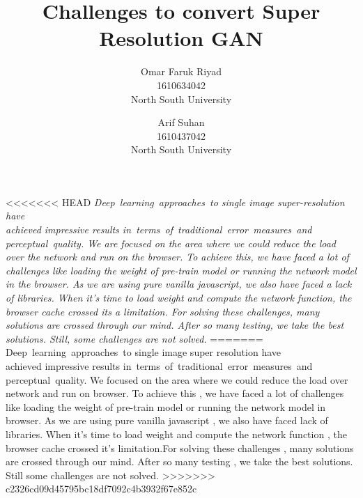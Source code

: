 \documentclass[a4paper,12pt]{article}
\title
{
	Challenges to convert Super Resolution GAN
}
\author
{
	Omar Faruk Riyad  \\
	1610634042 \\ 
	North South University  \\
	\and 
	Arif Suhan \\
	1610437042 \\
	North South University  \\
}
\providecommand{\keywords}[1]{\textbf{\textit{Keywords:}} #1}
\begin{document}
\maketitle

\abstract
{
<<<<<<< HEAD
	\textit{
	Deep learning approaches to single image super-resolution have\\
    achieved impressive results in terms of traditional error measures and\\
    perceptual quality. We are focused on the area where we could reduce the load over the network and run on the browser. To achieve this, we have faced a lot of challenges like loading the weight of pre-train model or running the network model in the browser. As we are using pure vanilla javascript, we also have faced a lack of libraries. When it’s time to load weight and compute the network function, the browser cache crossed its a limitation. For solving these challenges, many solutions are crossed through our mind. After so many testing, we take the best solutions. Still, some challenges are not solved.
	}
=======
	Deep learning approaches to single image super resolution have \\
	achieved impressive results in terms of traditional error measures and \\
	perceptual quality. We focused on the area where we could reduce the load over network and run on browser. To achieve this , we have faced a lot of challenges like loading the weight of pre-train model or running the network model in browser. As we are using pure vanilla javascript , we also have faced lack of libraries. When it’s time to load weight and compute the network function , the browser cache crossed it’s limitation.For solving these challenges , many solutions are crossed through our mind. After so many testing , we take the best solutions. Still some challenges are not solved.
>>>>>>> c2326cd09d45795bc18df7092c4b3932f67e852c
} 

\end{document}
